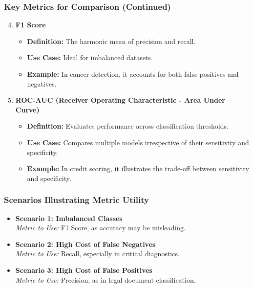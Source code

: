 \documentclass[aspectratio=169]{beamer}
\begin{document}
\begin{frame}[fragile]
    \frametitle{Key Metrics for Comparison (Continued)}
    \begin{enumerate}
        \setcounter{enumi}{3}
        \item \textbf{F1 Score}
            \begin{itemize}
                \item \textbf{Definition:} The harmonic mean of precision and recall.
                \item \textbf{Use Case:} Ideal for imbalanced datasets.
                \item \textbf{Example:} In cancer detection, it accounts for both false positives and negatives.
            \end{itemize}

        \item \textbf{ROC-AUC (Receiver Operating Characteristic - Area Under Curve)}
            \begin{itemize}
                \item \textbf{Definition:} Evaluates performance across classification thresholds.
                \item \textbf{Use Case:} Compares multiple models irrespective of their sensitivity and specificity.
                \item \textbf{Example:} In credit scoring, it illustrates the trade-off between sensitivity and specificity.
            \end{itemize}
    \end{enumerate}
\end{frame}

\begin{frame}[fragile]
    \frametitle{Scenarios Illustrating Metric Utility}
    \begin{itemize}
        \item \textbf{Scenario 1: Imbalanced Classes} \\ 
              \textit{Metric to Use:} F1 Score, as accuracy may be misleading.
              
        \item \textbf{Scenario 2: High Cost of False Negatives} \\ 
              \textit{Metric to Use:} Recall, especially in critical diagnostics.
              
        \item \textbf{Scenario 3: High Cost of False Positives} \\ 
              \textit{Metric to Use:} Precision, as in legal document classification.
    \end{itemize}
\end{frame}
\end{document}
